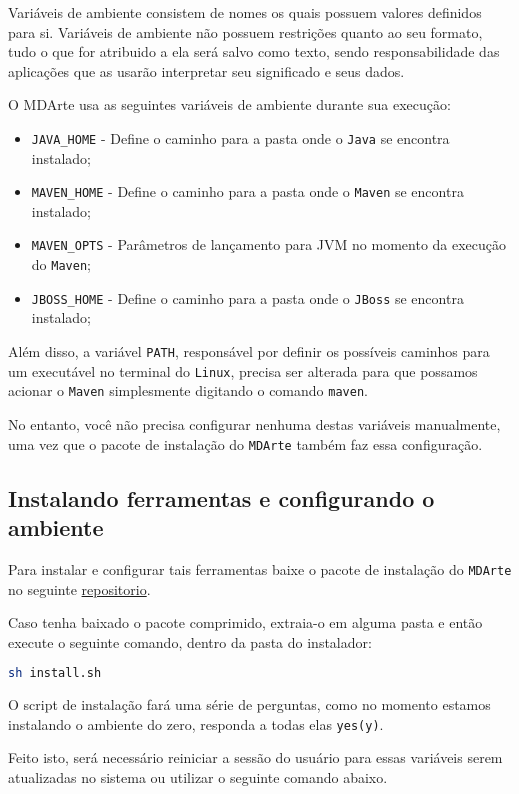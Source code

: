 Variáveis de ambiente consistem de nomes os quais possuem valores definidos para
si. Variáveis de ambiente não possuem restrições quanto ao seu formato, tudo o
que for atribuido a ela será salvo como texto, sendo responsabilidade das
aplicações que as usarão interpretar seu significado e seus dados. 

O MDArte usa as seguintes variáveis de ambiente durante sua execução:
\begin{itemize}
  \item \texttt{JAVA\_HOME} - Define o caminho para a pasta onde o \texttt{Java}
  se encontra instalado;
  \item \texttt{MAVEN\_HOME} - Define o caminho para a pasta onde o
  \texttt{Maven} se encontra instalado;
  \item \texttt{MAVEN\_OPTS} - Parâmetros de lançamento para JVM no momento da
  execução do \texttt{Maven};
  \item \texttt{JBOSS\_HOME} - Define o caminho para a pasta onde o
  \texttt{JBoss} se encontra instalado;
\end{itemize}

Além disso, a variável \texttt{PATH}, responsável por definir os possíveis
caminhos para um executável no terminal do \texttt{Linux}, precisa ser alterada
para que possamos acionar o \texttt{Maven} simplesmente digitando o comando
\texttt{maven}.

No entanto, você não precisa configurar nenhuma destas variáveis manualmente,
uma vez que o pacote de instalação do \texttt{MDArte} também faz essa
configuração.

\subsection{Instalando ferramentas e configurando o ambiente}
Para instalar e configurar tais ferramentas baixe o pacote de instalação do
\texttt{MDArte} no seguinte
\href{https://github.com/MDArte/mdarte-installer}{repositorio}.

Caso tenha baixado o pacote comprimido, extraia-o em alguma pasta e então
execute o seguinte comando, dentro da pasta do instalador:
\begin{lstlisting}[language=bash]
	sh install.sh
\end{lstlisting}

O script de instalação fará uma série de perguntas, como no momento estamos
instalando o ambiente do zero, responda a todas elas \texttt{yes(y)}.

Feito isto, será necessário reiniciar a sessão do usuário para essas variáveis
serem atualizadas no sistema ou utilizar o seguinte comando abaixo.

